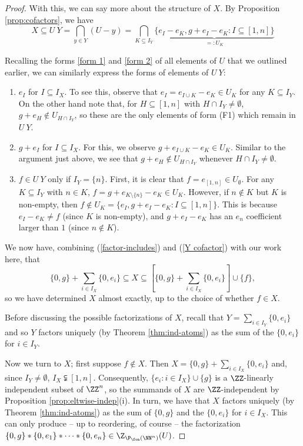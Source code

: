 \begin{proof}
	With this, we can say more about the structure of $X$.
	By Proposition \ref{prop:cofactors}, we have 
	\[X \subseteq U\:Y = \bigcap_{y\in Y}(U-y) = \bigcap_{K\subseteq I_Y} \underbrace{\{e_I - e_K, g+e_I - e_K : I\subseteq [ 1,n ] \}}_{=:U_K} \tag{2} \label{Y cofactor}\]
	
	Recalling the forms \ref{form 1} and \ref{form 2} of all elements of $U$ that we outlined earlier, we can similarly express the forms of elements of $U\:Y$:
	\begin{enumerate}[label={\rm (F\arabic{*}$'$)}]
		\item $e_I$ for $I\subseteq I_X$. \label{form 1'}
		To see this, observe that $e_I = e_{I\cup K}-e_K\in U_K$ for any $K\subseteq I_Y$.
		On the other hand note that, for $H \subseteq [ 1,n ]$ with $H\cap I_Y\neq \emptyset$, $g+e_H\notin U_{H\cap I_Y}$, so these are the only elements of form (F1) which remain in $U\:Y$.
		\item $g+e_I$ for $I\subseteq I_X$. \label{form 2'}
		For this, we observe $g+e_{I\cup K} - e_K\in U_K$. 
		Similar to the argument just above, we see that $g+e_H\notin U_{H\cap I_Y}$ whenever $H\cap I_Y\neq\emptyset$.
		\item $f\in U\:Y$ only if $I_Y = \{n\}$. \label{form 3'}
		First, it is clear that $f = e_{[ 1,n ]} \in U_\emptyset$.
		For any $K\subseteq I_Y$ with $n\in K$, $f = g+ e_{K\setminus\{n\}} - e_K\in U_K$.
		However, if $n\notin K$ but $K$ is non-empty, then $f\notin U_K = \{e_I, g+e_I-e_K: I\subseteq [1,n]\}$.
		This is because $e_I - e_K \neq f$ (since $K$ is non-empty), and $g+e_I-e_K$ has an $e_n$ coefficient larger than $1$ (since $n\notin K$).
	\end{enumerate}
	We now have, combining (\ref{factor-includes}) and (\ref{Y cofactor}) with our work here, that
	\[ \{0,g\} + \sum_{i\in I_X}\{0,e_i\} \subseteq X \subseteq \left[\{0,g\}+\sum_{i\in I_X} \{0,e_i\} \right]\cup\{f\},\]
	so we have determined $X$ almost exactly, up to the choice of whether $f\in X$.
	
	Before discussing the possible factorizations of $X$, recall that $Y = \sum_{i\in I_Y} \{0,e_i\}$ and so $Y$ factors uniquely (by Theorem \ref{thm:ind-atoms}) as the sum of the $\{0,e_i\}$ for $i\in I_Y$.
	
	Now we turn to $X$; first suppose $f\notin X$.
	Then $X = \{0,g\} +\sum_{i\in I_X} \{0,e_i\}$ and, since $I_Y\neq\emptyset$, $I_X\subsetneqq [1,n]$.
	Consequently, $\{e_i: i\in I_X\}\cup\{g\}$ is a $\ZZ$-linearly independent subset of $\ZZ^n$, so the summands of $X$ are $\ZZ$-independent by Proposition \ref{prop:eltwise-indep}(i).
	In turn, we have that $X$ factors uniquely (by Theorem \ref{thm:ind-atoms}) as the sum of $\{0,g\}$ and the $\{0,e_i\}$ for $i\in I_X$.
	This can only produce -- up to reordering, of course -- the factorization $\{0,g\}*\{0,e_1\}*\cdots*\{0,e_n\}\in \Z_{\P_\fon(\NN^n)}(U)$.
	

\end{proof}
